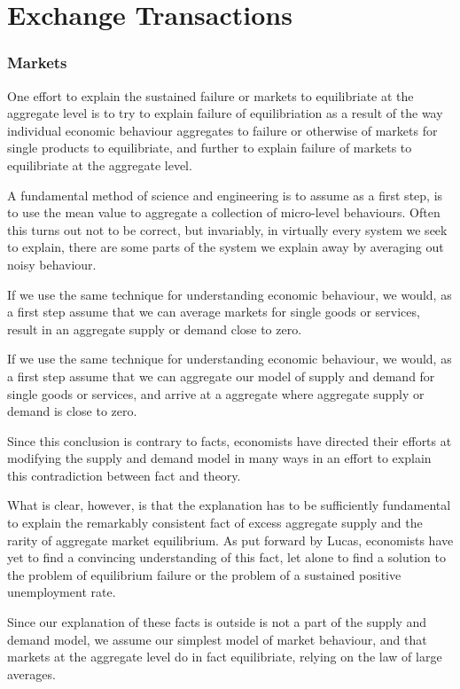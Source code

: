 \chapter{Exchange Transactions}
\label{chapter:exchange_transactions}

\subsection{Markets}

One effort to explain the sustained failure or markets to equilibriate at the aggregate level is to
try to explain failure of equilibriation as a result of the way individual economic behaviour
aggregates to failure or otherwise of markets for single products to equilibriate, and further to
explain failure of markets to equilibriate at the aggregate level.

A fundamental method of science and engineering is to assume as a first step, is to use the mean
value to aggregate a collection of micro-level behaviours. Often this turns out not to be correct,
but invariably, in virtually every system we seek to explain, there are some parts of the system we
explain away by averaging out noisy behaviour. 

If we use the same technique for understanding economic behaviour, we would, as a first step assume
that we can average markets for single goods or services, result in an aggregate supply or demand
close to zero.

If we use the same technique for understanding economic behaviour, we would, as a first step assume
that we can aggregate our model of supply and demand for single goods or services, and arrive at a
aggregate where aggregate supply or demand is close to zero.

Since this conclusion is contrary to facts, economists have directed their efforts at modifying the
supply and demand model in many ways in an effort to explain this contradiction between fact and
theory.

What is clear, however, is that the explanation has to be sufficiently fundamental to explain the
remarkably consistent fact of excess aggregate supply and the rarity of aggregate market
equilibrium. As put forward by Lucas, economists have yet to find a convincing understanding of
this fact, let alone to find a solution to the problem of equilibrium failure or the problem of
a sustained positive unemployment rate. 

Since our explanation of these facts is outside is not a part of the supply and demand model, we
assume our simplest model of market behaviour, and that markets at the aggregate level do in fact
equilibriate, relying on the law of large averages.

